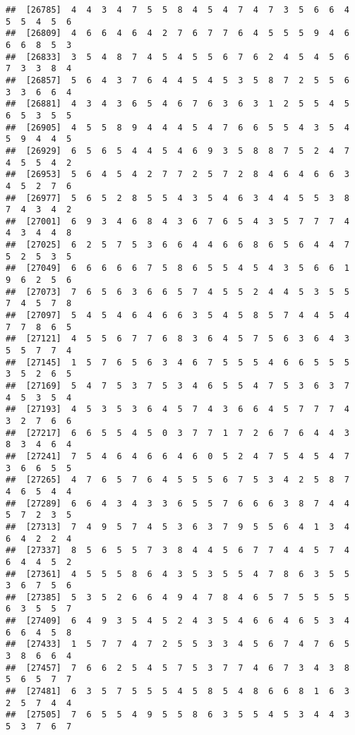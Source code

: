 \documentclass[
]{book}
\begin{document}
\begin{verbatim}
##  [26785]  4  4  3  4  7  5  5  8  4  5  4  7  4  7  3  5  6  6  4  5  5  4  5  6
##  [26809]  4  6  6  4  6  4  2  7  6  7  7  6  4  5  5  5  9  4  6  6  6  8  5  3
##  [26833]  3  5  4  8  7  4  5  4  5  5  6  7  6  2  4  5  4  5  6  7  3  3  8  4
##  [26857]  5  6  4  3  7  6  4  4  5  4  5  3  5  8  7  2  5  5  6  3  3  6  6  4
##  [26881]  4  3  4  3  6  5  4  6  7  6  3  6  3  1  2  5  5  4  5  6  5  3  5  5
##  [26905]  4  5  5  8  9  4  4  4  5  4  7  6  6  5  5  4  3  5  4  5  9  4  4  5
##  [26929]  6  5  6  5  4  4  5  4  6  9  3  5  8  8  7  5  2  4  7  4  5  5  4  2
##  [26953]  5  6  4  5  4  2  7  7  2  5  7  2  8  4  6  4  6  6  3  4  5  2  7  6
##  [26977]  5  6  5  2  8  5  5  4  3  5  4  6  3  4  4  5  5  3  8  7  4  3  4  2
##  [27001]  6  9  3  4  6  8  4  3  6  7  6  5  4  3  5  7  7  7  4  4  3  4  4  8
##  [27025]  6  2  5  7  5  3  6  6  4  4  6  6  8  6  5  6  4  4  7  5  2  5  3  5
##  [27049]  6  6  6  6  6  7  5  8  6  5  5  4  5  4  3  5  6  6  1  9  6  2  5  6
##  [27073]  7  6  5  6  3  6  6  5  7  4  5  5  2  4  4  5  3  5  5  7  4  5  7  8
##  [27097]  5  4  5  4  6  4  6  6  3  5  4  5  8  5  7  4  4  5  4  7  7  8  6  5
##  [27121]  4  5  5  6  7  7  6  8  3  6  4  5  7  5  6  3  6  4  3  5  5  7  7  4
##  [27145]  1  5  7  6  5  6  3  4  6  7  5  5  5  4  6  6  5  5  5  3  5  2  6  5
##  [27169]  5  4  7  5  3  7  5  3  4  6  5  5  4  7  5  3  6  3  7  4  5  3  5  4
##  [27193]  4  5  3  5  3  6  4  5  7  4  3  6  6  4  5  7  7  7  4  3  2  7  6  6
##  [27217]  6  6  5  5  4  5  0  3  7  7  1  7  2  6  7  6  4  4  3  8  3  4  6  4
##  [27241]  7  5  4  6  4  6  6  4  6  0  5  2  4  7  5  4  5  4  7  3  6  6  5  5
##  [27265]  4  7  6  5  7  6  4  5  5  5  6  7  5  3  4  2  5  8  7  4  6  5  4  4
##  [27289]  6  6  4  3  4  3  3  6  5  5  7  6  6  6  3  8  7  4  4  5  7  2  3  5
##  [27313]  7  4  9  5  7  4  5  3  6  3  7  9  5  5  6  4  1  3  4  6  4  2  2  4
##  [27337]  8  5  6  5  5  7  3  8  4  4  5  6  7  7  4  4  5  7  4  6  4  4  5  2
##  [27361]  4  5  5  5  8  6  4  3  5  3  5  5  4  7  8  6  3  5  5  3  6  7  5  6
##  [27385]  5  3  5  2  6  6  4  9  4  7  8  4  6  5  7  5  5  5  5  6  3  5  5  7
##  [27409]  6  4  9  3  5  4  5  2  4  3  5  4  6  6  4  6  5  3  4  6  6  4  5  8
##  [27433]  1  5  7  7  4  7  2  5  5  3  3  4  5  6  7  4  7  6  5  3  8  6  6  4
##  [27457]  7  6  6  2  5  4  5  7  5  3  7  7  4  6  7  3  4  3  8  5  6  5  7  7
##  [27481]  6  3  5  7  5  5  5  4  5  8  5  4  8  6  6  8  1  6  3  2  5  7  4  4
##  [27505]  7  6  5  5  4  9  5  5  8  6  3  5  5  4  5  3  4  4  3  5  3  7  6  7

\end{verbatim}
\end{document}
